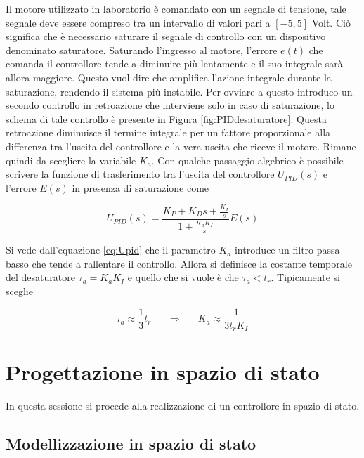 \documentclass[english]{article}
\newcommand{\trippleSpacing}{\phantom{aaa}}	%
\begin{document}
		\noindent Il motore utilizzato in laboratorio è comandato con un segnale di tensione, tale segnale deve essere compreso tra un intervallo di valori pari a $[-5,5]$ Volt. Ciò significa che è necessario saturare il segnale di controllo con un dispositivo denominato saturatore. Saturando l'ingresso al motore, l'errore $e(t)$ che comanda il controllore tende a diminuire più lentamente e il suo integrale sarà allora maggiore. Questo vuol dire che amplifica l'azione integrale durante la saturazione, rendendo il sistema più instabile. Per ovviare a questo introduco un secondo controllo in retroazione che interviene solo in caso di saturazione, lo schema di tale controllo è presente in Figura \ref{fig:PIDdesaturatore}. Questa retroazione diminuisce il termine integrale per un fattore proporzionale alla differenza tra l'uscita del controllore e la vera uscita che riceve il motore. Rimane quindi da scegliere la variabile $K_a$. Con qualche passaggio algebrico è possibile scrivere la funzione di trasferimento tra l'uscita del controllore $U_{PID}(s)$ e l'errore $E(s)$ in presenza di saturazione come   
	
		\begin{equation}
			U_{PID}(s)=\frac{K_P+K_Ds+\frac{K_I}{s}}{1+\frac{K_aK_I}{s}}E(s)
			\label{eq:Upid}
		\end{equation}
	
		\noindent Si vede dall'equazione \ref{eq:Upid} che il parametro $K_a$ introduce un filtro passa basso che tende a rallentare il controllo. Allora si definisce la costante temporale del desaturatore $\tau_a=K_aK_I$ e quello che si vuole è che $\tau_a<t_r$. Tipicamente si sceglie
		
		\begin{equation}
			\tau_a \approx \frac{1}{3}t_r \trippleSpacing \Rightarrow \trippleSpacing K_a \approx \frac{1}{3t_rK_I}
		\end{equation}
		
		
		
		
		
		
\section{Progettazione in spazio di stato}
\label{sec:spazioDiStato}	

	In questa sessione si procede alla realizzazione di un controllore in spazio di stato.
	
	\subsection{Modellizzazione in spazio di stato}
	\label{subsec:ModelloStato}
	
\end{document}
